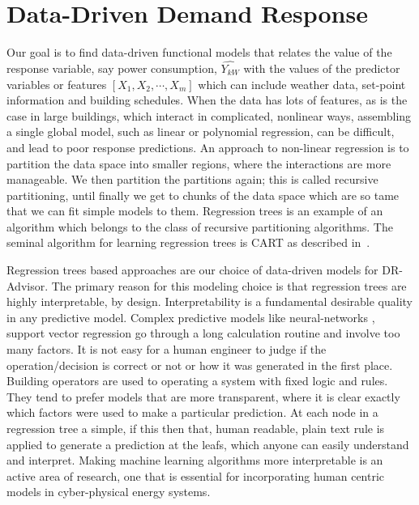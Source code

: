 \documentclass{sig-alternate-ipsn13}
\theoremstyle{definition}
\begin{document}
%

\section{Data-Driven Demand Response}
\label{sec:drtree}
Our goal is to find data-driven functional models that relates the value of the response variable, say power consumption, $\hat{Y_{kW}}$ with the values of the predictor variables or features $[X_1, X_2,\cdots, X_m]$ which can include weather data, set-point information and building schedules.
When the data has lots of features, as is the case in large buildings, which interact in complicated, nonlinear ways, assembling a single global model, such as linear or polynomial regression, can be difficult, and lead to poor response predictions.
An approach to non-linear regression is to partition the data space into smaller regions, where the interactions are more manageable. 
We then partition the partitions again; this is called recursive partitioning, until finally we get to chunks of the data space which are so tame that we can fit simple models to them. 
Regression trees is an example of an algorithm which belongs to the class of recursive partitioning algorithms. The seminal algorithm for learning regression trees is CART as described in~\cite{breiman1984classification}. 

Regression trees based approaches are our choice of data-driven models for DR-Advisor. The primary reason for this modeling choice is that regression trees are highly interpretable, by design.
Interpretability is a fundamental desirable quality in any predictive model.  
Complex predictive models like neural-networks , support vector regression \etc go through a long calculation routine and involve too many factors. 
It is not easy for a human engineer to judge if the operation/decision is correct or not or how it was generated in the first place. 
Building operators are used to operating a system with fixed logic and rules. 
They tend to prefer models that are more transparent, where it is clear exactly which factors were used to make a particular prediction.
At each node in a regression tree a simple, if this then that, human readable, plain text rule is applied to generate a prediction at the leafs, which anyone can easily understand and interpret.
Making machine learning algorithms more interpretable is an active area of research, one that is essential for incorporating human centric models in cyber-physical energy systems.
\end{document}
